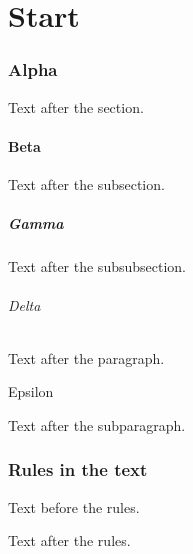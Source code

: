 \documentclass{article}
\begin{document}
\tableofcontents
\part{Start}
\section{Alpha}
Text after the section.
\subsection{Beta}
Text after the subsection.
\subsubsection{Gamma}
Text after the subsubsection.
\paragraph{Delta} Text after the paragraph.
\subparagraph{Epsilon} Text after the subparagraph.
\section{Rules in the text}
Text before the rules.

\begin{minipage}{10em}
\titlerule

\titlerule*[1em]{-}

\end{minipage}

Text after the rules.
\end{document}
